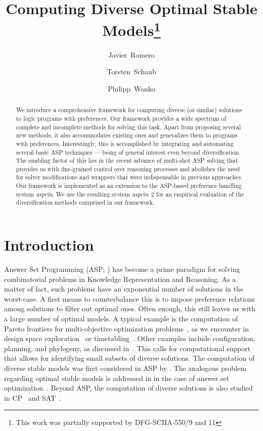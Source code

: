 \documentclass[a4paper,USenglish]{oasics-v2016}
\title{Computing Diverse Optimal Stable Models\footnote{This work was partially supported by DFG-SCHA-550/9 and 11}}
\author[1]{Javier~Romero}
\author[1,2]{Torsten~Schaub}
\author[1]{Philipp~Wanko}
\affil[1]{University of Potsdam, Germany}
\affil[2]{INRIA Rennes, France}
\newcommand{\sysfont}{\textit}
\newcommand{\asprin}{\sysfont{asprin}}
\begin{document}
\maketitle
%
\begin{abstract}
We introduce a comprehensive framework for computing diverse (or similar) solutions to logic programs with preferences.
Our framework provides a wide spectrum of complete and incomplete methods for solving this task.
Apart from proposing several new methods, it also accommodates existing ones and generalizes them to programs with preferences.
Interestingly, this is accomplished by integrating and automating several basic ASP techniques --- being of general interest even beyond diversification.
The enabling factor of this lies in the recent advance of multi-shot ASP solving that provides us with fine-grained control over reasoning
processes and abolishes the need for solver modifications and wrappers that were indispensable in previous approaches.
Our framework is implemented as an extension to the ASP-based preference handling system \asprin.
We use the resulting system \asprin~2 for an empirical evaluation of the
diversification methods comprised in our framework.
\end{abstract}

\section{Introduction}\label{sec:introduction}
 
Answer Set Programming (ASP; \cite{baral02a}) has become a prime paradigm for solving combinatorial problems in Knowledge Representation and Reasoning. 
As a matter of fact,
such problems have an exponential number of solutions in the worst-case.
A first means to counterbalance this is to impose preference relations among solutions
to filter out optimal ones.
Often enough, this still leaves us with a large number of optimal models.
%
A typical example is the computation of Pareto frontiers for multi-objective optimization problems~\cite{pareto64a},
as we encounter in design space exploration~\cite{angeglharesc13a} or timetabling~\cite{basotainsc13a}.
%
Other examples include configuration, planning, and phylogeny, as discussed in~\cite{eiererfi13a}.
%
This calls for computational support that allows for identifying small subsets of diverse solutions.
%
The computation of diverse stable models was first considered in ASP by \cite{eiererfi13a}.
The analogous problem regarding optimal stable models is addressed in \cite{zhutru13a} in the case of answer set optimization~\cite{brnitr03a}.
Beyond ASP, the computation of diverse solutions is also studied in CP~\cite{hehnocwa05a} and SAT~\cite{nadel11a}.
\end{document}
